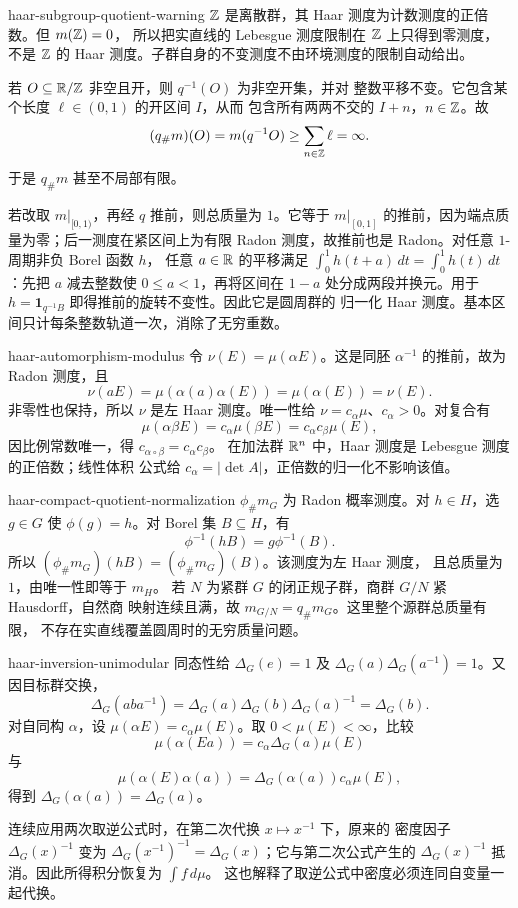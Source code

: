 \begin{solution}{haar-subgroup-quotient-warning}
$\mathbb{Z}$ 是离散群，其 Haar 测度为计数测度的正倍数。但 $m(\mathbb{Z})=0$，
所以把实直线的 Lebesgue 测度限制在 $\mathbb{Z}$ 上只得到零测度，不是
$\mathbb{Z}$ 的 Haar 测度。子群自身的不变测度不由环境测度的限制自动给出。

若 $O\subseteq\mathbb{R}/\mathbb{Z}$ 非空且开，则 $q^{-1}(O)$ 为非空开集，并对
整数平移不变。它包含某个长度 $\ell\in(0,1)$ 的开区间 $I$，从而
包含所有两两不交的 $I+n$，$n\in\mathbb{Z}$。故
\[
 (q_\#m)(O)=m(q^{-1}O)\ge\sum_{n\in\mathbb{Z}}\ell=\infty.
\]
于是 $q_\#m$ 甚至不局部有限。

若改取 $m|_{[0,1)}$，再经 $q$ 推前，则总质量为 $1$。它等于
$m|_{[0,1]}$ 的推前，因为端点质量为零；后一测度在紧区间上为有限
Radon 测度，故推前也是 Radon。对任意 $1$-周期非负 Borel 函数 $h$，
任意 $a\in\mathbb{R}$ 的平移满足
$\int_0^1h(t+a)\,dt=\int_0^1h(t)\,dt$：先把 $a$ 减去整数使
$0\le a<1$，再将区间在 $1-a$ 处分成两段并换元。用于
$h=\mathbf1_{q^{-1}B}$ 即得推前的旋转不变性。因此它是圆周群的
归一化 Haar 测度。基本区间只计每条整数轨道一次，消除了无穷重数。
\end{solution}

\begin{solution}{haar-automorphism-modulus}
令 $\nu(E)=\mu(\alpha E)$。这是同胚 $\alpha^{-1}$ 的推前，故为
Radon 测度，且
\[
 \nu(aE)=\mu(\alpha(a)\alpha(E))=\mu(\alpha(E))=\nu(E).
\]
非零性也保持，所以 $\nu$ 是左 Haar 测度。唯一性给
$\nu=c_\alpha\mu$、$c_\alpha>0$。对复合有
\[
 \mu(\alpha\beta E)=c_\alpha\mu(\beta E)
 =c_\alpha c_\beta\mu(E),
\]
因比例常数唯一，得 $c_{\alpha\circ\beta}=c_\alpha c_\beta$。
在加法群 $\mathbb{R}^n$ 中，Haar 测度是 Lebesgue 测度的正倍数；线性体积
公式给 $c_\alpha=|\det A|$，正倍数的归一化不影响该值。
\end{solution}

\begin{solution}{haar-compact-quotient-normalization}
$\phi_\#m_G$ 为 Radon 概率测度。对 $h\in H$，选 $g\in G$ 使
$\phi(g)=h$。对 Borel 集 $B\subseteq H$，有
\[
 \phi^{-1}(hB)=g\phi^{-1}(B).
\]
所以 $(\phi_\#m_G)(hB)=(\phi_\#m_G)(B)$。该测度为左 Haar 测度，
且总质量为 $1$，由唯一性即等于 $m_H$。
若 $N$ 为紧群 $G$ 的闭正规子群，商群 $G/N$ 紧 Hausdorff，自然商
映射连续且满，故 $m_{G/N}=q_\#m_G$。这里整个源群总质量有限，
不存在实直线覆盖圆周时的无穷质量问题。
\end{solution}

\begin{solution}{haar-inversion-unimodular}
同态性给 $\Delta_G(e)=1$ 及
$\Delta_G(a)\Delta_G(a^{-1})=1$。又因目标群交换，
\[
 \Delta_G(aba^{-1})
 =\Delta_G(a)\Delta_G(b)\Delta_G(a)^{-1}=\Delta_G(b).
\]
对自同构 $\alpha$，设 $\mu(\alpha E)=c_\alpha\mu(E)$。取
$0<\mu(E)<\infty$，比较
\[
 \mu(\alpha(Ea))=c_\alpha\Delta_G(a)\mu(E)
\]
与
\[
 \mu(\alpha(E)\alpha(a))
 =\Delta_G(\alpha(a))c_\alpha\mu(E),
\]
得到 $\Delta_G(\alpha(a))=\Delta_G(a)$。

连续应用两次取逆公式时，在第二次代换 $x\mapsto x^{-1}$ 下，原来的
密度因子 $\Delta_G(x)^{-1}$ 变为
$\Delta_G(x^{-1})^{-1}=\Delta_G(x)$；它与第二次公式产生的
$\Delta_G(x)^{-1}$ 抵消。因此所得积分恢复为 $\int f\,d\mu$。
这也解释了取逆公式中密度必须连同自变量一起代换。
\end{solution}

